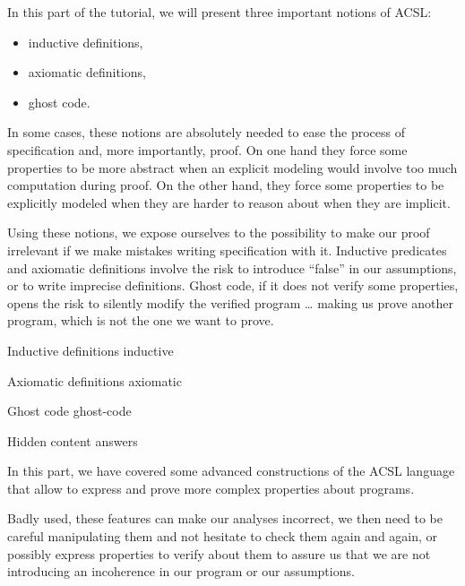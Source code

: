 In this part of the tutorial, we will present three important notions of ACSL:
\begin{itemize}
\item inductive definitions,
\item axiomatic definitions,
\item ghost code.
\end{itemize}


In some cases, these notions are absolutely needed to ease the process of
specification and, more importantly, proof. On one hand they force some
properties to be more abstract when an explicit modeling would involve too much
computation during proof. On the other hand, they force some properties to be
explicitly modeled when they are harder to reason about when they are implicit.

Using these notions, we expose ourselves to the possibility to make our
proof irrelevant if we make mistakes writing specification with it. Inductive
predicates and axiomatic definitions involve the risk to introduce ``false'' in
our assumptions, or to write imprecise definitions. Ghost code, if it does not
verify some properties, opens the risk to silently modify the verified program
\ldots{} making us prove another program, which is not the one we want to prove.


\begin{levelTwo}
  {Inductive definitions}
  {inductive}
\end{levelTwo}

\begin{levelTwo}
  {Axiomatic definitions}
  {axiomatic}
\end{levelTwo}

\begin{levelTwo}
  {Ghost code}
  {ghost-code}
\end{levelTwo}

\begin{levelTwo}
  {Hidden content}
  {answers}
\end{levelTwo}


\horizontalLine
\newpage


In this part, we have covered some advanced constructions of the ACSL
language that allow to express and prove more complex properties about
programs.

Badly used, these features can make our analyses incorrect, we then need
to be careful manipulating them and not hesitate to check them again and
again, or possibly express properties to verify about them to assure us
that we are not introducing an incoherence in our program or our
assumptions.
